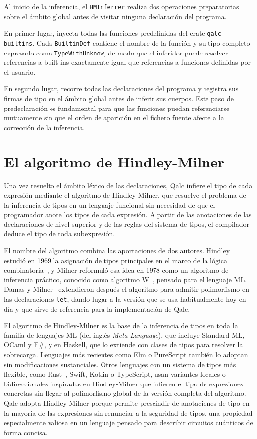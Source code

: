 Al inicio de la inferencia, el \lstinline|HMInferrer| realiza dos operaciones preparatorias sobre el ámbito global antes de visitar ninguna declaración del programa.

En primer lugar, inyecta todas las funciones predefinidas del crate \lstinline|qalc-builtins|. Cada \lstinline|BuiltinDef| contiene el nombre de la función y su tipo completo expresado como \lstinline|TypeWithUnknow|, de modo que el inferidor puede resolver referencias a built-ins exactamente igual que referencias a funciones definidas por el usuario.

En segundo lugar, recorre todas las declaraciones del programa y registra sus firmas de tipo en el ámbito global antes de inferir sus cuerpos. Este paso de predeclaración es fundamental para que las funciones puedan referenciarse mutuamente sin que el orden de aparición en el fichero fuente afecte a la corrección de la inferencia.

\section{El algoritmo de Hindley-Milner}
\label{sec:hm}

Una vez resuelto el ámbito léxico de las declaraciones, Qalc infiere el tipo de cada expresión mediante el algoritmo de Hindley-Milner, que resuelve el problema de la inferencia de tipos en un lenguaje funcional sin necesidad de que el programador anote los tipos de cada expresión. A partir de las anotaciones de las declaraciones de nivel superior y de las reglas del sistema de tipos, el compilador deduce el tipo de toda subexpresión.

El nombre del algoritmo combina las aportaciones de dos autores. Hindley estudió en 1969 la asignación de tipos principales en el marco de la lógica combinatoria~\cite{hindley_1969}, y Milner reformuló esa idea en 1978 como un algoritmo de inferencia práctico, conocido como algoritmo W~\cite{milner_1978}, pensado para el lenguaje ML. Damas y Milner~\cite{damas_milner_1982} extendieron después el algoritmo para admitir polimorfismo en las declaraciones \lstinline|let|, dando lugar a la versión que se usa habitualmente hoy en día y que sirve de referencia para la implementación de Qalc.

El algoritmo de Hindley-Milner es la base de la inferencia de tipos en toda la familia de lenguajes ML (del inglés \textit{Meta Language}), que incluye Standard ML, OCaml y F#, y en Haskell, que lo extiende con clases de tipos para resolver la sobrecarga. Lenguajes más recientes como Elm o PureScript también lo adoptan sin modificaciones sustanciales. Otros lenguajes con un sistema de tipos más flexible, como Rust~\cite{matsakis_rust_2014}, Swift, Kotlin o TypeScript, usan variantes locales o bidireccionales inspiradas en Hindley-Milner que infieren el tipo de expresiones concretas sin llegar al polimorfismo global de la versión completa del algoritmo. Qalc adopta Hindley-Milner porque permite prescindir de anotaciones de tipo en la mayoría de las expresiones sin renunciar a la seguridad de tipos, una propiedad especialmente valiosa en un lenguaje pensado para describir circuitos cuánticos de forma concisa.


